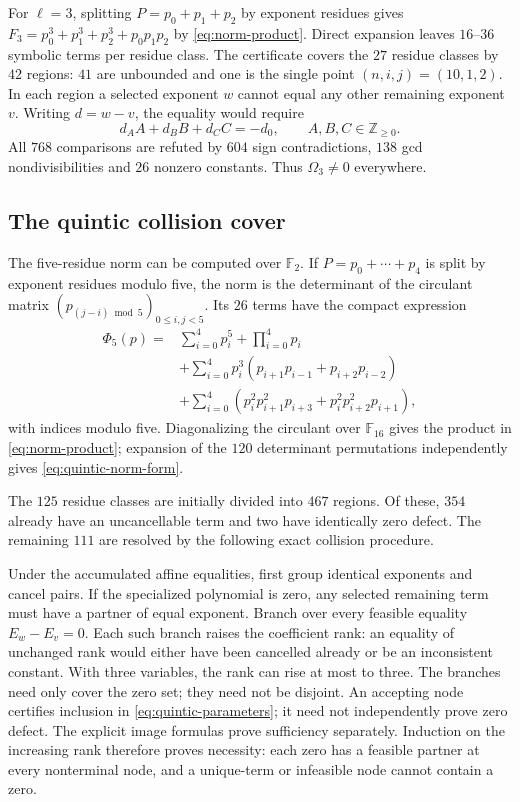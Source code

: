 \documentclass[11pt]{article}
\theoremstyle{definition}
\theoremstyle{remark}
\begin{document}
For $\ell=3$, splitting $P=p_0+p_1+p_2$ by exponent residues gives
$F_3=p_0^3+p_1^3+p_2^3+p_0p_1p_2$ by \eqref{eq:norm-product}.
Direct expansion leaves $16$--$36$ symbolic
terms per residue class. The certificate covers the $27$ residue
classes by $42$ regions: $41$ are unbounded and one is the single
point \mbox{$(n,i,j)=(10,1,2)$}.
In each region a selected exponent $w$ cannot equal any other
remaining exponent $v$. Writing $d=w-v$, the equality would require
\[
 d_A A+d_B B+d_C C=-d_0,\qquad A,B,C\in\mathbb Z_{\ge0}.
\]
All $768$ comparisons are refuted by $604$ sign contradictions,
$138$ gcd nondivisibilities and $26$ nonzero constants.
Thus $\Omega_3\ne0$ everywhere.

\subsection{The quintic collision cover}
The five-residue norm can be computed over $\mathbb F_2$.
If $P=p_0+\cdots+p_4$ is split by exponent residues modulo five,
the norm is the determinant of the circulant matrix
$(p_{(j-i)\bmod5})_{0\le i,j<5}$.
Its $26$ terms have the compact expression
\begin{equation}\label{eq:quintic-norm-form}
\begin{split}
 \Phi_5(p)={}&\sum_{i=0}^4p_i^5+\prod_{i=0}^4p_i\\
 &+\sum_{i=0}^4p_i^3
          (p_{i+1}p_{i-1}+p_{i+2}p_{i-2})\\
 &+\sum_{i=0}^4
       (p_i^2p_{i+1}^2p_{i+3}+p_i^2p_{i+2}^2p_{i+1}),
\end{split}
\end{equation}
with indices modulo five. Diagonalizing the circulant over
$\mathbb F_{16}$ gives the product in \eqref{eq:norm-product};
expansion of the $120$ determinant permutations independently
gives \eqref{eq:quintic-norm-form}.

The $125$ residue classes are initially divided into $467$ regions.
Of these, $354$ already have an uncancellable term and two have
identically zero defect. The remaining $111$ are resolved by the
following exact collision procedure.

Under the accumulated affine equalities, first group identical
exponents and cancel pairs. If the specialized polynomial is zero,
any selected remaining term must have a partner of equal exponent.
Branch over every feasible equality $E_w-E_v=0$. Each such branch
raises the coefficient rank: an equality of unchanged rank would
either have been cancelled already or be an inconsistent constant.
With three variables, the rank can rise at most to three.
The branches need only cover the zero set; they need not be disjoint.
An accepting node certifies inclusion in \eqref{eq:quintic-parameters};
it need not independently prove zero defect.
The explicit image formulas prove sufficiency separately.
Induction on the increasing rank therefore proves necessity:
each zero has a feasible partner at every nonterminal node,
and a unique-term or infeasible node cannot contain a zero.
\end{document}
